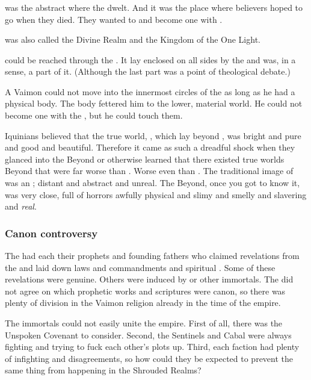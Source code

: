 \subsubsection{\Atziluth}
\Atziluth was the abstract  where the \sephiroth dwelt.
And it was the place where believers hoped to go when they died.
They wanted to  and become one with \iquin. 

\Atziluth was also called the Divine Realm and the Kingdom of the One Light. 

\Atziluth could be reached through the . 
It lay enclosed on all sides by the \empyrean and was, in a sense, a part of it. 
(Although the last part was a point of theological debate.)

A Vaimon could not move into the innermost circles of the \empyrean as long as he had a physical body.
The body fettered him to the lower, material world.
He could not become one with the \sephiroth, but he could touch them. 

Iquinians believed that the true world, \Atziluth, which lay beyond \Gehinnom, was bright and pure and good and beautiful. 
Therefore it came as such a dreadful shock when they glanced into the Beyond or otherwise learned that there existed true worlds Beyond that were far worse than \Gehinnom. 
Worse even than \itzach.
The traditional image of \itzach was an ; distant and abstract and unreal. 
The Beyond, once you got to know it, was very close, full of horrors awfully physical and slimy and smelly and slavering and \emph{real}. 





\subsubsection{Canon controversy}
The \VaimonClans had each their prophets and founding fathers who claimed revelations from the \sephiroth and laid down laws and commandments and spiritual .
Some of these revelations were genuine.
Others were induced by \qliphoth or other immortals.
The \vclans did not agree on which prophetic works and scriptures were canon, so there was plenty of division in the Vaimon religion already in the time of the empire.

The immortals could not easily unite the empire.
First of all, there was the Unspoken Covenant to consider.
Second, the Sentinels and Cabal were always fighting and trying to fuck each other's plots up.
Third, each faction had plenty of infighting and disagreements, so how could they be expected to prevent the same thing from happening in the Shrouded Realms?





